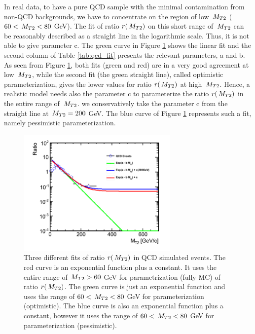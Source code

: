 In real data, to have a pure QCD sample with the minimal contamination from non-QCD backgrounds, we have to 
concentrate on the region of low $\,{M_{T2}}$ ($60 < \,{M_{T2}} < 80$ GeV). 
The fit of ratio $r(\,{M_{T2}})$ on this short range of $\,{M_{T2}}$ can be reasonably described as a straight line in the logarithmic scale.
Thus, it is not able to give parameter c. 
The green curve in Figure \ref{fig:qcd_ratio} shows the linear fit and 
the second column of Table \ref{tab:qcd_fit} presents the relevant parameters, a and b.
As 
seen 
from Figure \ref{fig:qcd_ratio}, both fits (green and red) are in 
a very good agreement at low $\,{M_{T2}}$, while the second fit (the green straight line), 
called optimistic parameterization, gives the lower values for ratio $r(\,{M_{T2}})$ 
at high $\,{M_{T2}}$. 
Hence, a realistic model needs also the parameter c to parameterize 
the ratio $r(\,{M_{T2}})$ in the entire range of $\,{M_{T2}}$. 
we conservatively 
take the parameter c from the straight line at $\,{M_{T2}} = 200$ GeV. 
The blue curve of Figure \ref{fig:qcd_ratio} represents such a fit, 
namely pessimistic parameterization. 

\begin{linenomath}
\begin{figure}[h]
\centering
\includegraphics[width=0.7\textwidth,keepaspectratio=true]{QCDFig/qcd_ratio.png}
\caption{Three different fits of ratio $r(\,{M_{T2}})$  in QCD simulated events. 
The red curve is an exponential function plus a constant. It uses
the entire range of $\,{M_{T2}} > 60$ GeV for parametrization (fully-MC) of ratio $r(\,{M_{T2}})$. 
The green curve is just an exponential function and uses the range of $60 < \,{M_{T2}} < 80$ GeV 
for parameterization (optimistic). 
The blue curve is also an exponential function plus a constant, 
however it uses the range of $60 < \,{M_{T2}} < 80$ GeV for parameterization (pessimistic).}
\label{fig:qcd_ratio}
\end{figure}
\end{linenomath}


